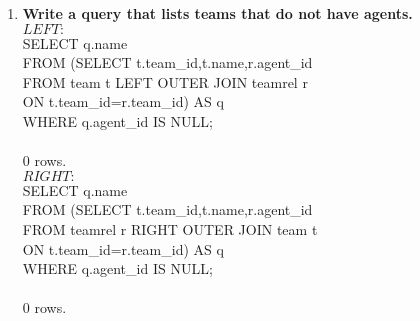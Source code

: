 \documentclass{article}
\begin{document}
\begin{enumerate}
\item
\textbf{Write a query that lists teams that do not have agents.\\}
$LEFT:$\\
SELECT q.name\\
FROM (SELECT t.team\_id,t.name,r.agent\_id\\
\hspace*{1 cm}FROM team t LEFT OUTER JOIN teamrel r\\
\hspace*{1 cm}ON t.team\_id=r.team\_id) AS q\\
\hspace*{5 cm}                        WHERE q.agent\_id IS NULL;\\
\\0 rows.\\

$RIGHT:$\\
SELECT q.name\\
FROM (SELECT t.team\_id,t.name,r.agent\_id\\
\hspace*{1 cm}FROM teamrel r RIGHT OUTER JOIN team t\\
\hspace*{1 cm}ON t.team\_id=r.team\_id) AS q\\
\hspace*{5 cm}                        WHERE q.agent\_id IS NULL;\\
\\0 rows.\\

\end{enumerate}

\pagebreak
\end{document}
